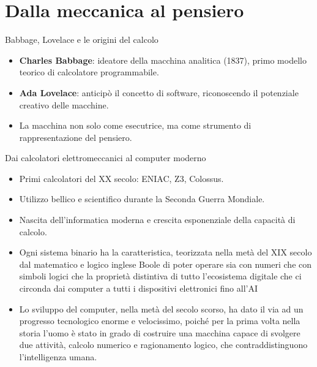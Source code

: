 \documentclass{beamer}
\begin{document}
\section{Dalla meccanica al pensiero}
%
%
\begin{frame}{Babbage, Lovelace e le origini del calcolo}
  \begin{itemize}
    \item \textbf{Charles Babbage}: ideatore della macchina analitica (1837), primo modello teorico di calcolatore programmabile.
    \item \textbf{Ada Lovelace}: anticipò il concetto di software, riconoscendo il potenziale creativo delle macchine.
    \item La macchina non solo come esecutrice, ma come strumento di rappresentazione del pensiero.
  \end{itemize}
\end{frame}
%
%
\begin{frame}{Dai calcolatori elettromeccanici al computer moderno}
  \begin{itemize}
    \item Primi calcolatori del XX secolo: ENIAC, Z3, Colossus.
    \item Utilizzo bellico e scientifico durante la Seconda Guerra Mondiale.
    \item Nascita dell'informatica moderna e crescita esponenziale della capacità di calcolo.
  \end{itemize}
\end{frame}
%
%
\begin{frame}
\begin{itemize}
\item Ogni sistema binario ha la caratteristica, teorizzata nella metà del XIX secolo dal matematico e logico inglese Boole di poter operare sia con numeri che con simboli logici che la proprietà distintiva di tutto l'ecosistema digitale che ci circonda dai computer a tutti i dispositivi elettronici fino all'AI

\item Lo sviluppo del computer, nella metà del secolo scorso, ha dato il via ad un progresso tecnologico enorme e velocissimo, poiché per la prima volta nella storia l'uomo è stato in grado di costruire una macchina capace di svolgere due attività, calcolo numerico e ragionamento logico, che contraddistinguono l'intelligenza umana. 
\end{itemize}

\end{frame}
\end{document}
